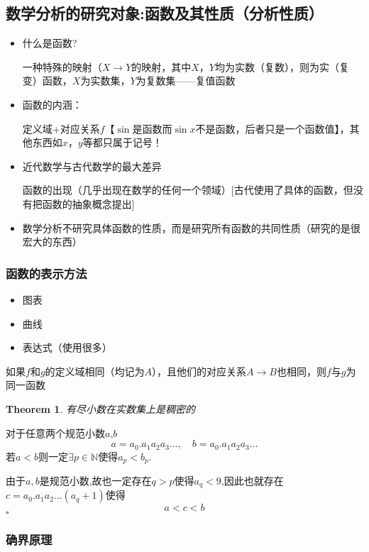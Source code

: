 \documentclass[11pt,hyperref,a4paper,UTF8]{ctexart}
\newtheorem{theorem}{Theorem}[subsection]
\newenvironment{cproof}{%
\heiti{证明}\kaishu
}{%
  \hfill $\square$
  \par\bigskip
}
\newcommand{\NN}{\mathbb{N}}
\begin{document}
\begin{CJK}{UTF8}{gkai}
\subsection{数学分析的研究对象:函数及其性质（分析性质）}

\begin{itemize}
  \item 什么是函数?

  一种特殊的映射（$X\to Y$的映射，其中$X$，$Y$均为实数（复数），则为实（复变）函数，$X$为实数集，$Y$为复数集——复值函数
  \item 函数的内涵：
  
  定义域+对应关系$f$【$\sin$是函数而$\sin x$不是函数，后者只是一个函数值】，其他东西如$x$，$y$等都只属于记号！
  \item 近代数学与古代数学的最大差异

  函数的出现（几乎出现在数学的任何一个领域）[古代使用了具体的函数，但没有把函数的抽象概念提出]
  \item 数学分析不研究具体函数的性质，而是研究所有函数的共同性质（研究的是很宏大的东西）
\end{itemize}

\subsubsection{函数的表示方法}
\begin{itemize}
  \item 图表
  \item 曲线
  \item 表达式（使用很多）
\end{itemize}
如果$f$和$g$的定义域相同（均记为$A$），且他们的对应关系$A\rightarrow B$也相同，则$f$与$g$为同一函数
\begin{theorem}
  有尽小数在实数集上是稠密的
\end{theorem}

\begin{cproof}
  对于任意两个规范小数$a$,$b$
  \[a=a_0. a_1 a_2 a_3\ldots,\quad b=a_0. a_1 a_2 a_3\ldots\]
  若$a<b$则一定$\exists p \in \NN$使得$a_p<b_p$.

  由于$a,b$是规范小数,故也一定存在$q > p$使得$a_q < 9$,因此也就存在$c=a_0. a_1 a_2 \ldots (a_q+1) $使得
  \[a < c < b\]
\end{cproof}

\subsubsection{确界原理}
  

\end{CJK}
\end{document}
